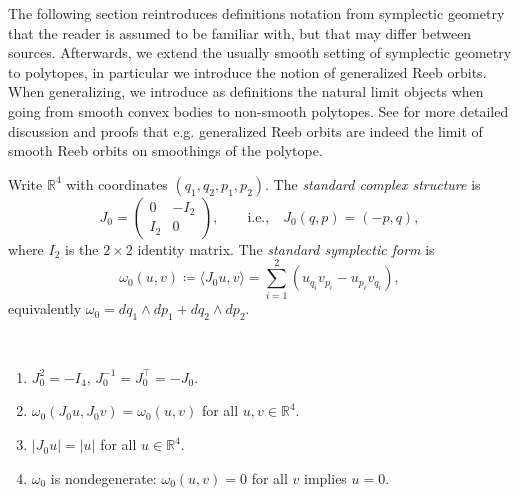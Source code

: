 %
%


The following section reintroduces definitions notation from symplectic geometry that the reader is assumed to be familiar with, but that may differ between sources.
Afterwards, we extend the usually smooth setting of symplectic geometry to polytopes, in particular we introduce the notion of generalized Reeb orbits.
When generalizing, we introduce as definitions the natural limit objects when going from smooth convex bodies to non-smooth polytopes.
See \cite{CH2021} for more detailed discussion and proofs that e.g. generalized Reeb orbits are indeed the limit of smooth Reeb orbits on smoothings of the polytope.

\begin{definition}\label{def:symplectic-form}
Write $\mathbb{R}^4$ with coordinates $(q_1, q_2, p_1, p_2)$.
The \emph{standard complex structure} is
\[
  J_0 = \begin{pmatrix} 0 & -I_2 \\ I_2 & 0 \end{pmatrix},
  \qquad\text{i.e.,}\quad
  J_0(q, p) = (-p, q),
\]
where $I_2$ is the $2 \times 2$ identity matrix.
The \emph{standard symplectic form} is
\[
  \omega_0(u, v) \coloneqq \langle J_0 u, v \rangle
  = \sum_{i=1}^{2} (u_{q_i} v_{p_i} - u_{p_i} v_{q_i}),
\]
equivalently $\omega_0 = dq_1 \wedge dp_1 + dq_2 \wedge dp_2$.
\end{definition}

\begin{remark}\label{rem:j0-properties}
~
\begin{enumerate}
\item $J_0^2 = -I_4$, \quad $J_0^{-1} = J_0^\top = -J_0$.
\item $\omega_0(J_0 u, J_0 v) = \omega_0(u, v)$ for all $u, v \in \mathbb{R}^4$.
\item $|J_0 u| = |u|$ for all $u \in \mathbb{R}^4$.
\item $\omega_0$ is nondegenerate: $\omega_0(u, v) = 0$ for all $v$ implies $u = 0$.
\end{enumerate}
\end{remark}

